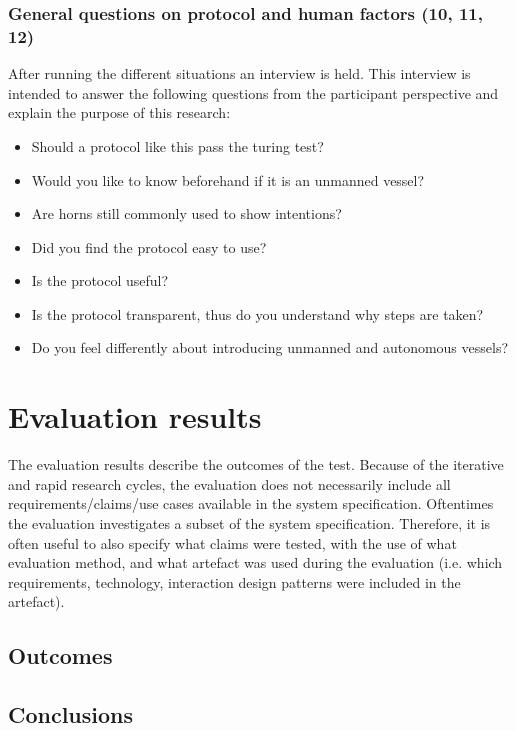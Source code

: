 \subsubsection{General questions on protocol and human factors (10, 11, 12)}
After running the different situations an interview is held. This interview is intended to answer the following questions from the participant perspective and explain the purpose of this research:
\begin{itemize}
	\item Should a protocol like this pass the turing test?
	\item Would you like to know beforehand if it is an unmanned vessel?
	\item Are horns still commonly used to show intentions?
	\item Did you find the protocol easy to use?
	\item Is the protocol useful?
	\item Is the protocol transparent, thus do you understand why steps are taken?
	\item Do you feel differently about introducing unmanned and autonomous vessels?
\end{itemize}

\section{Evaluation results}
The evaluation results describe the outcomes of the test. Because of the iterative and rapid research cycles, the evaluation does not necessarily include all requirements/claims/use cases available in the system specification. Oftentimes the evaluation investigates a subset of the system specification. Therefore, it is often useful to also specify what claims were tested, with the use of what evaluation method, and what artefact was used during the evaluation (i.e. which requirements, technology, interaction design patterns were included in the artefact).

\subsection{Outcomes}

\subsection{Conclusions}